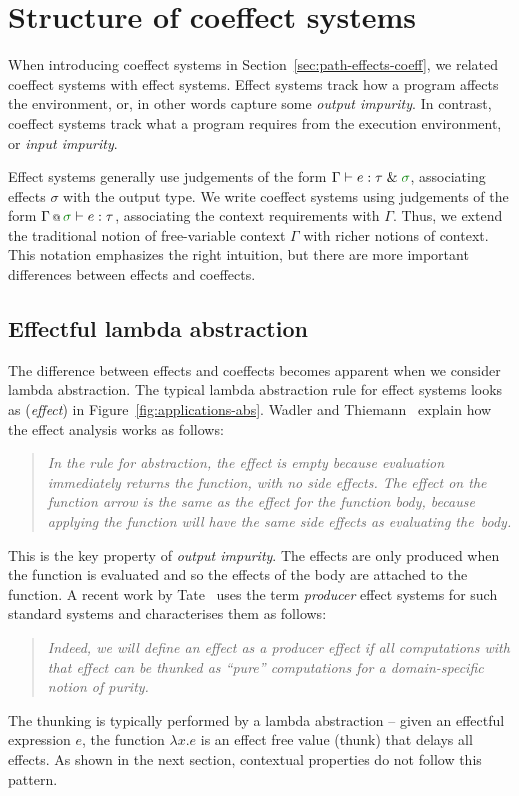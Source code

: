 \section{Structure of coeffect systems}
\label{sec:applications-structure}

When introducing coeffect systems in Section~\ref{sec:path-effects-coeff}, we related coeffect systems
with effect systems. Effect systems track how a program affects the environment, or, in other words
capture some \emph{output impurity}. In contrast, coeffect systems track what a program requires from
the execution environment, or \emph{input impurity}.

Effect systems generally use judgements of the form $\Gamma \vdash e : \tau \;\&\; \cclrd{\sigma}$,
associating effects $\sigma$ with the output type. We write coeffect
systems using judgements of the form $\coctx{\Gamma}{\cclrd{\sigma}} \vdash e : \tau$, associating
the context requirements with $\Gamma$. Thus, we extend the traditional notion of free-variable
context $\Gamma$ with richer notions of context. This notation emphasizes the right intuition,
but there are more important differences between effects and coeffects.


\subsection{Effectful lambda abstraction}
\label{sec:applications-structure-lam}

The difference between effects and coeffects becomes apparent when we consider lambda abstraction.
The typical lambda abstraction rule for effect systems looks as (\emph{effect}) in
Figure~\ref{fig:applications-abs}. Wadler and Thiemann~\cite{monads-effects-marriage} explain how
the effect analysis works as follows:
%
\begin{quote}
\emph{In the rule for abstraction, the effect is empty because evaluation immediately
returns the function, with no side effects. The effect on the function arrow
is the same as the effect for the function body, because applying the function will
have the same side effects as evaluating the~body.}
\end{quote}
%
This is the key property of \emph{output impurity}. The effects are only produced when the
function is evaluated and so the effects of the body are attached to the function. A recent
work by Tate~\cite{effects-producer-semantics} uses the term \emph{producer} effect systems
for such standard systems and characterises them as follows:
%
\begin{quote}
\emph{Indeed, we will define an effect as a producer effect if all computations with that
effect can be thunked as ``pure'' computations for a domain-specific notion of purity.}
\end{quote}
%
The thunking is typically performed by a lambda abstraction -- given an effectful expression
$e$, the function $\lambda x.e$ is an effect free value (thunk) that delays all effects.
As shown in the next section, contextual properties do not follow this pattern.

